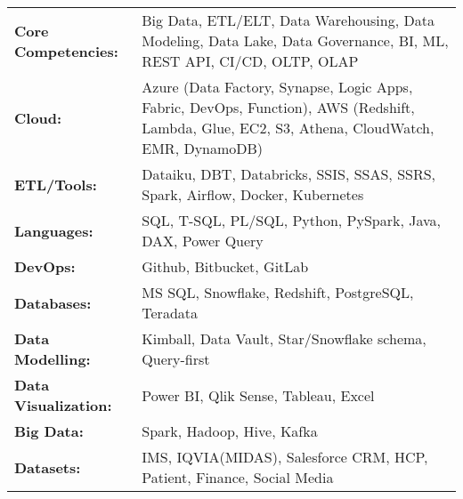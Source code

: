 

\begin{onecolentry}
    \begin{tabularx}{\linewidth}{l X}
        \textbf{Core Competencies:} & Big Data, ETL/ELT, Data Warehousing, Data Modeling, Data Lake, Data Governance, BI, ML, REST API, CI/CD, OLTP, OLAP \\
        \textbf{Cloud:} & Azure (Data Factory, Synapse, Logic Apps, Fabric, DevOps, Function), AWS (Redshift, Lambda, Glue, EC2, S3, Athena, CloudWatch, EMR, DynamoDB) \\
        \textbf{ETL/Tools:} & Dataiku, DBT, Databricks, SSIS, SSAS, SSRS, Spark, Airflow, Docker, Kubernetes \\
        \textbf{Languages:} & SQL, T-SQL, PL/SQL, Python, PySpark, Java, DAX, Power Query \\
        \textbf{DevOps:} & Github, Bitbucket, GitLab \\
        \textbf{Databases:} & MS SQL, Snowflake, Redshift, PostgreSQL, Teradata \\
        \textbf{Data Modelling:} & Kimball, Data Vault, Star/Snowflake schema, Query-first \\ 
        \textbf{Data Visualization:} & Power BI, Qlik Sense, Tableau, Excel \\
        \textbf{Big Data:} & Spark, Hadoop, Hive, Kafka \\
        \textbf{Datasets:} & IMS, IQVIA(MIDAS), Salesforce CRM, HCP, Patient, Finance, Social Media \\
    \end{tabularx}
\end{onecolentry}




